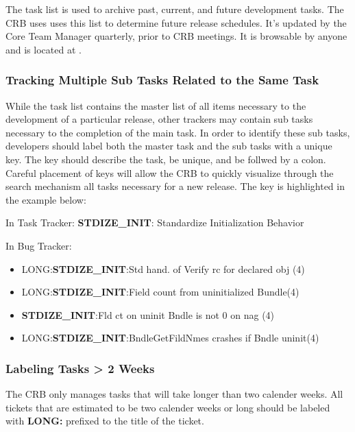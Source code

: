 The task list is used to archive past, current, and future development tasks.  The CRB uses uses this list to determine future release schedules.  It's updated by the Core Team Manager quarterly, prior to CRB meetings.  It is browsable by anyone and is located at
.

\subsubsection{Tracking Multiple Sub Tasks Related to the Same Task}

While the task list contains the master list of all items necessary to the development of a particular release, other trackers may contain sub tasks 
necessary to the completion of the main task. In order to identify these sub tasks, developers should label both the master task and the sub tasks with a 
unique key. The key should describe the task, be unique, and be follwed by a colon. Careful placement of keys will allow the CRB to quickly visualize
through the search mechanism all tasks necessary for a new release. The key is highlighted in the example below:

\vspace{5mm}
In Task Tracker: {\bf STDIZE\_INIT}: Standardize Initialization Behavior

\vspace{5mm}
In Bug Tracker:
\begin{itemize}
\item LONG:{\bf STDIZE\_INIT}:Std hand. of Verify rc for declared obj (4)
\item LONG:{\bf STDIZE\_INIT}:Field count from uninitialized Bundle(4)
\item {\bf STDIZE\_INIT}:Fld ct on uninit Bndle is not 0 on nag (4)
\item LONG:{\bf STDIZE\_INIT}:BndleGetFildNmes crashes if Bndle uninit(4)
\end{itemize}

\subsubsection{Labeling Tasks > 2 Weeks}

The CRB only manages tasks that will take longer than two calender weeks. All tickets that are estimated to be two calender weeks or long should
be labeled with {\bf LONG:} prefixed to the title of the ticket. 

